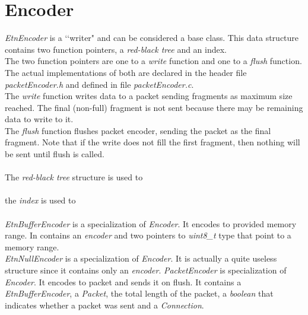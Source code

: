 \section*{Encoder}
\emph{EtnEncoder} is a \lq\lq writer" and can be considered a base class. This data structure contains two function pointers, a \emph{red-black tree} and an index.\\
The two function pointers are one to a \emph{write} function and one to a \emph{flush} function. The actual implementations of both are declared in the header file \emph{packetEncoder.h} and defined in file \emph{packetEncoder.c}.\\
The \emph{write} function  writes data to a packet sending fragments as maximum size reached. The final (non-full) fragment is not sent because there may be remaining data to write to it.\\
The \emph{flush} function flushes packet encoder, sending the packet as the final fragment. Note that if the write does not fill the first fragment, then nothing will be sent until flush is called.\\\\
The \emph{red-black tree} structure is used to \\\\
the \emph{index} is used to \\\\
\emph{EtnBufferEncoder} is a specialization of \emph{Encoder}. It encodes to provided memory range. In contains an \emph{encoder} and two pointers to \emph{uint8\_t} type that point to a memory range.\\
\emph{EtnNullEncoder} is a specialization of \emph{Encoder}. It is actually a quite useless structure since it contains only an \emph{encoder}.
\emph{PacketEncoder} is specialization of \emph{Encoder}. 
It encodes to packet and sends it on flush. It contains a \emph{EtnBufferEncoder}, a \emph{Packet}, the total length of the packet, a \emph{boolean} that indicates whether a packet was sent and a \emph{Connection}. 



















\begin{comment}
// The parent encoder class.
typedef struct EtnEncoder_s {
	int (*write)(struct EtnEncoder_s *e, uint8_t *data, EtnLength length);
	void (*flush)(struct EtnEncoder_s *e);
	void *topLevelPointer; // See comments in encoder.c.
	struct rbtree addrToIndex;
	EtnLength index;
} EtnEncoder;

// Encoder subclass that encodes to provided memory range.
typedef struct EtnBufferEncoder_s {
	EtnEncoder encoder;
	uint8_t *dataCurrent;
	uint8_t *dataEnd;
} EtnBufferEncoder;

// Encoder subclass that throws away encoded data;
// useful to determine what size of encoded data will be.
typedef struct EtnNullEncoder_s {
	EtnEncoder encoder;
} EtnNullEncoder;
\end{comment}
